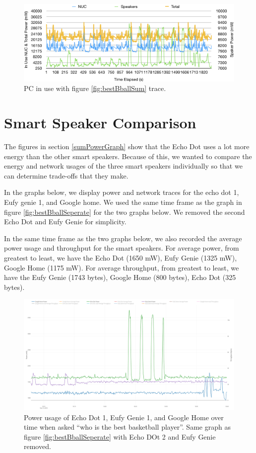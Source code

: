 \begin{figure}[H]
  \centering
  \includegraphics[width=1\textwidth]{figures/nucInUse.png}
  \caption{PC in use with figure \ref{fig:bestBballSum} trace.}
  \label{fig:nucInUse}
\end{figure}

\section{Smart Speaker Comparison}
\label{smartSpeakerComparisonSection}
The figures in section \ref{sumPowerGraph} show that the Echo Dot uses a lot more energy than the other smart speakers. Because of this, we wanted to compare the energy and network usages of the three smart speakers individually so that we can determine trade-offs that they make.

In the graphs below, we display power and network traces for the echo dot 1, Eufy genie 1, and Google home. We used the same time frame as the graph in figure \ref{fig:bestBballSeperate} for the two graphs below. We removed the second Echo Dot and Eufy Genie for simplicity.

In the same time frame as the two graphs below, we also recorded the average power usage and throughput for the smart speakers. For average power, from greatest to least, we have the Echo Dot (1650 mW), Eufy Genie (1325 mW), Google Home (1175 mW). For average throughput, from greatest to least, we have the Eufy Genie (1743 bytes), Google Home (800 bytes), Echo Dot (325 bytes).

\begin{figure}[H]
  \centering
  \includegraphics[width=1\textwidth]{figures/smartSpeakerSeperate.png}
  \caption{Power usage of Echo Dot 1, Eufy Genie 1, and Google Home over time when asked ``who is the best basketball player''. Same graph as figure \ref{fig:bestBballSeperate} with Echo DOt 2 and Eufy Genie removed.}
  \label{fig:smartSpeakerSeperate}
\end{figure}

